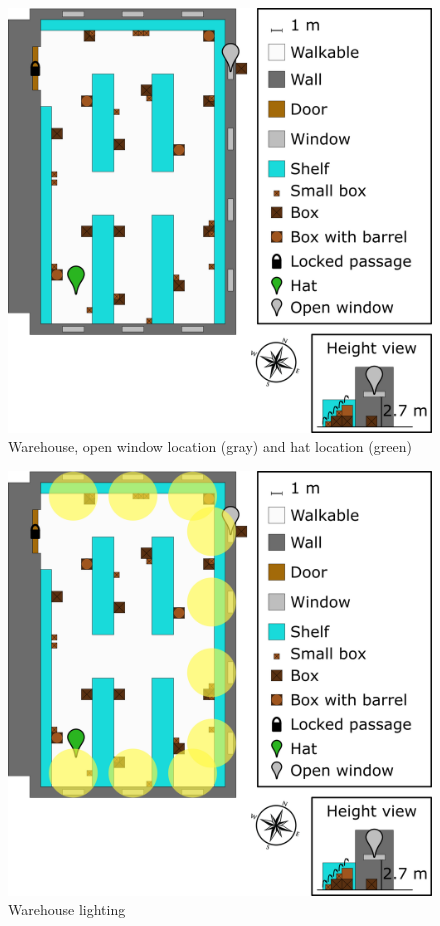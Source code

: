\begin{figure}[H]
  \centering
  \includegraphics[width=\textwidth]{../Images/Maps/warehouse}
  \caption{Warehouse, open window location (gray) and hat location (green)}
\end{figure}

\begin{figure}[H]
  \centering
  \includegraphics[width=\textwidth]{../Images/Maps/warehouseLighting}
  \caption{Warehouse lighting}
\end{figure}

